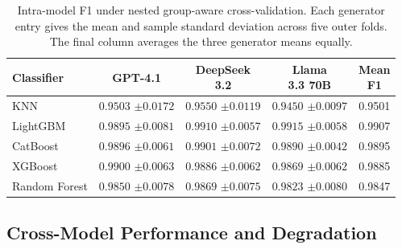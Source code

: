 \documentclass[conference]{IEEEtran}
\newenvironment{FitTable}{%
  \begin{lrbox}{\PaperTableBox}%
}{%
  \end{lrbox}%
  \ifdim\wd\PaperTableBox>\linewidth
    \resizebox{\linewidth}{!}{\usebox{\PaperTableBox}}%
  \else
    \usebox{\PaperTableBox}%
  \fi
}
\begin{document}
\begin{table}[!htbp]
\centering
\setlength{\tabcolsep}{2pt}
\renewcommand{\arraystretch}{1.05}
\footnotesize
\caption{Intra-model F1 under nested group-aware cross-validation.
Each generator entry gives the mean and sample standard deviation
across five outer folds. The final column averages the three
generator means equally.}
\label{tab:intra-results}
\begin{FitTable}
\begin{tabular}{@{}lcccc@{}}
\toprule
Classifier & GPT-4.1 & \shortstack{DeepSeek\\3.2} & \shortstack{Llama\\3.3 70B}
& \shortstack{Mean\\F1} \\
\midrule
KNN
& \shortstack{$0.9503$\\$\pm 0.0172$}
& \shortstack{$0.9550$\\$\pm 0.0119$}
& \shortstack{$0.9450$\\$\pm 0.0097$}
& 0.9501 \\
LightGBM
& \shortstack{$0.9895$\\$\pm 0.0081$}
& \shortstack{$0.9910$\\$\pm 0.0057$}
& \shortstack{$0.9915$\\$\pm 0.0058$}
& 0.9907 \\
CatBoost
& \shortstack{$0.9896$\\$\pm 0.0061$}
& \shortstack{$0.9901$\\$\pm 0.0072$}
& \shortstack{$0.9890$\\$\pm 0.0042$}
& 0.9895 \\
XGBoost
& \shortstack{$0.9900$\\$\pm 0.0063$}
& \shortstack{$0.9886$\\$\pm 0.0062$}
& \shortstack{$0.9869$\\$\pm 0.0062$}
& 0.9885 \\
Random Forest
& \shortstack{$0.9850$\\$\pm 0.0078$}
& \shortstack{$0.9869$\\$\pm 0.0075$}
& \shortstack{$0.9823$\\$\pm 0.0080$}
& 0.9847 \\
\bottomrule
\end{tabular}
\end{FitTable}
\end{table}

\subsection{Cross-Model Performance and Degradation}
\end{document}
